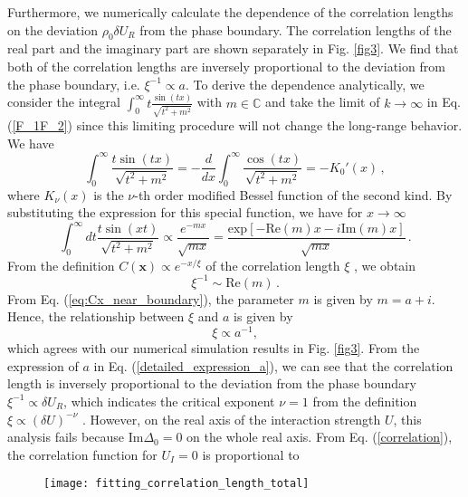 \documentclass[aps,prl,twocolumn,superscriptaddress]{revtex4-1}
\begin{document}
\begin{bibunit}
Furthermore, we numerically calculate the dependence of the correlation lengths on the deviation
$\rho_{0}\delta U_{R}$ from the phase boundary. The correlation lengths of the real part and the imaginary
part are shown separately in Fig. \ref{fig3}. We find that both of the correlation lengths are inversely proportional to the deviation from the phase boundary, i.e. $\xi^{-1}\propto a$. To derive the dependence analytically, we consider the integral $\int_0^{\infty}t\frac{\sin(tx)}{\sqrt{t^2+m^2}}$ with $m\in\mathbb{C}$ and take the limit of $k\to\infty$ in Eq. (\ref{F_1F_2}) since this limiting procedure will not change the long-range behavior. We have
\begin{equation}
	\int_0^{\infty}\frac{t\sin(tx)}{\sqrt{t^2+m^2}}=-\frac{d}{dx}\int_0^{\infty}\frac{\cos(tx)}{\sqrt{t^2+m^2}}=-K_0'(x)\,,
\end{equation}
where $K_{\nu}(x)$ is the $\nu$-th order modified Bessel function of the second kind. By substituting the expression for this special function, we have for $x\rightarrow\infty$
\begin{equation}
	\int_{0}^{\infty}dt\frac{t\sin(xt)}{\sqrt{t^{2}+m^{2}}}\propto \frac{e^{-mx}}{\sqrt{mx}}= \frac{\text{exp}[-\text{Re}(m)x-i\text{Im}(m)x]}{\sqrt{mx}}\,.
\end{equation}
From the definition $C(\bm{x})\propto e^{-x/\xi}$ of the correlation length $\xi$ \cite{Sachdev:2011uj}, we obtain
\begin{equation}
	\xi^{-1}\sim\text{Re}(m)\,.
\end{equation}
From Eq. (\ref{eq:Cx_near_boundary}), the parameter $m$ is given by $m=a+i$. Hence, the relationship between $\xi$ and $a$ is given by
\begin{equation}
	\xi\propto a^{-1},\label{corre_length}
\end{equation}
which agrees with our numerical simulation results in Fig. \ref{fig3}. From the expression of $a$ in Eq. (\ref{detailed_expression_a}), we can see that the correlation length is inversely proportional to the deviation from the phase boundary $\xi^{-1}\propto\delta U_R$, which indicates the critical exponent $\nu=1$ from the definition $\xi\propto(\delta U)^{-\nu}$ \cite{Sachdev:2011uj}. However, on the real axis of the interaction strength $U$, this analysis fails because $\text{Im}\Delta_0=0$ on the whole real axis. From Eq. (\ref{correlation}),  the correlation function for $U_I=0$ is proportional to
\begin{figure}
	\centering \texttt{[image: fitting\_correlation\_length\_total]}

\end{figure}
\end{bibunit}
\end{document}
